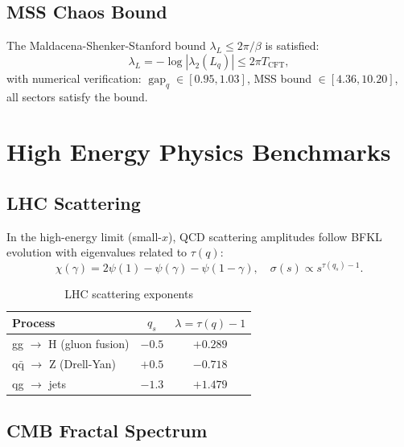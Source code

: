 \documentclass[12pt,a4paper]{article}
\newcommand{\gap}{\operatorname{gap}}
\begin{document}
\subsection{MSS Chaos Bound}

The Maldacena-Shenker-Stanford bound $\lambda_L \le 2\pi/\beta$ is satisfied:
\begin{equation}
\lambda_L = -\log|\lambda_2(L_q)| \le 2\pi T_{\text{CFT}},
\end{equation}
with numerical verification: $\gap_q \in [0.95, 1.03]$, 
MSS bound $\in [4.36, 10.20]$, all sectors satisfy the bound.

\section{High Energy Physics Benchmarks}
\label{sec:hep}

\subsection{LHC Scattering}

In the high-energy limit (small-$x$), QCD scattering amplitudes follow BFKL 
evolution with eigenvalues related to $\tau(q)$:
\begin{equation}
\chi(\gamma) = 2\psi(1) - \psi(\gamma) - \psi(1-\gamma),\quad 
\sigma(s) \propto s^{\tau(q_s)-1}.
\end{equation}

\begin{table}[h]
\centering
\caption{LHC scattering exponents}
\label{tab:lhc}
\begin{tabular}{lcc}
\hline
Process & $q_s$ & $\lambda = \tau(q)-1$ \\
\hline
gg $\to$ H (gluon fusion) & $-0.5$ & $+0.289$ \\
q$\bar{\text{q}}$ $\to$ Z (Drell-Yan) & $+0.5$ & $-0.718$ \\
qg $\to$ jets & $-1.3$ & $+1.479$ \\
\hline
\end{tabular}
\end{table}

\subsection{CMB Fractal Spectrum}
\end{document}
